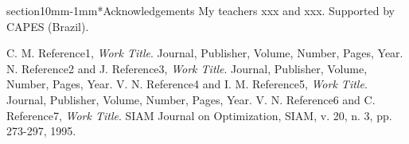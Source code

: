 \documentclass[a0,portrait]{a0poster}
\makeatletter
\renewcommand{\LARGE}{\fontsize{50}{70}\selectfont\bfseries} %
\renewcommand{\section}{\@startsection%
  {section}{1}{0mm}{-\baselineskip}{1mm}{\LARGE\color{myred}\bfseries}}
\makeatother
\begin{document}
\begin{multicols}{2}
\section*{Acknowledgements}
My teachers xxx and xxx. Supported by CAPES (Brazil).
\begin{thebibliography}{2}
	C. M. Reference1, {\it Work Title}. Journal, Publisher, Volume, Number, Pages,  Year.
N. Reference2 and J. Reference3,
\emph{Work Title}. Journal, Publisher, Volume, Number, Pages,  Year.
V. N. Reference4 and I. M. Reference5, \textit{Work Title}. Journal, Publisher, Volume, Number, Pages,  Year.
V. N. Reference6 and C. Reference7, \textit{Work Title}. SIAM Journal on Optimization, SIAM, v. 20, n. 3, pp. 273-297, 1995.

\end{thebibliography}
\end{multicols}
\end{document}
